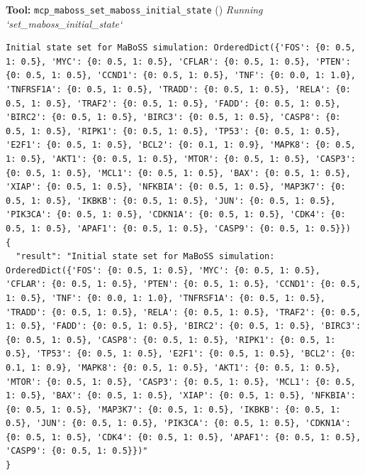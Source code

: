 \documentclass[11pt,a4paper]{article}
\begin{document}
\begin{toolokbox}
\textbf{Tool:} \texttt{mcp\_maboss\_set\_maboss\_initial\_state} (\checkmark)
\textit{Running `set\_maboss\_initial\_state`}
\begin{lstlisting}
Initial state set for MaBoSS simulation: OrderedDict({'FOS': {0: 0.5, 1: 0.5}, 'MYC': {0: 0.5, 1: 0.5}, 'CFLAR': {0: 0.5, 1: 0.5}, 'PTEN': {0: 0.5, 1: 0.5}, 'CCND1': {0: 0.5, 1: 0.5}, 'TNF': {0: 0.0, 1: 1.0}, 'TNFRSF1A': {0: 0.5, 1: 0.5}, 'TRADD': {0: 0.5, 1: 0.5}, 'RELA': {0: 0.5, 1: 0.5}, 'TRAF2': {0: 0.5, 1: 0.5}, 'FADD': {0: 0.5, 1: 0.5}, 'BIRC2': {0: 0.5, 1: 0.5}, 'BIRC3': {0: 0.5, 1: 0.5}, 'CASP8': {0: 0.5, 1: 0.5}, 'RIPK1': {0: 0.5, 1: 0.5}, 'TP53': {0: 0.5, 1: 0.5}, 'E2F1': {0: 0.5, 1: 0.5}, 'BCL2': {0: 0.1, 1: 0.9}, 'MAPK8': {0: 0.5, 1: 0.5}, 'AKT1': {0: 0.5, 1: 0.5}, 'MTOR': {0: 0.5, 1: 0.5}, 'CASP3': {0: 0.5, 1: 0.5}, 'MCL1': {0: 0.5, 1: 0.5}, 'BAX': {0: 0.5, 1: 0.5}, 'XIAP': {0: 0.5, 1: 0.5}, 'NFKBIA': {0: 0.5, 1: 0.5}, 'MAP3K7': {0: 0.5, 1: 0.5}, 'IKBKB': {0: 0.5, 1: 0.5}, 'JUN': {0: 0.5, 1: 0.5}, 'PIK3CA': {0: 0.5, 1: 0.5}, 'CDKN1A': {0: 0.5, 1: 0.5}, 'CDK4': {0: 0.5, 1: 0.5}, 'APAF1': {0: 0.5, 1: 0.5}, 'CASP9': {0: 0.5, 1: 0.5}})
{
  "result": "Initial state set for MaBoSS simulation: OrderedDict({'FOS': {0: 0.5, 1: 0.5}, 'MYC': {0: 0.5, 1: 0.5}, 'CFLAR': {0: 0.5, 1: 0.5}, 'PTEN': {0: 0.5, 1: 0.5}, 'CCND1': {0: 0.5, 1: 0.5}, 'TNF': {0: 0.0, 1: 1.0}, 'TNFRSF1A': {0: 0.5, 1: 0.5}, 'TRADD': {0: 0.5, 1: 0.5}, 'RELA': {0: 0.5, 1: 0.5}, 'TRAF2': {0: 0.5, 1: 0.5}, 'FADD': {0: 0.5, 1: 0.5}, 'BIRC2': {0: 0.5, 1: 0.5}, 'BIRC3': {0: 0.5, 1: 0.5}, 'CASP8': {0: 0.5, 1: 0.5}, 'RIPK1': {0: 0.5, 1: 0.5}, 'TP53': {0: 0.5, 1: 0.5}, 'E2F1': {0: 0.5, 1: 0.5}, 'BCL2': {0: 0.1, 1: 0.9}, 'MAPK8': {0: 0.5, 1: 0.5}, 'AKT1': {0: 0.5, 1: 0.5}, 'MTOR': {0: 0.5, 1: 0.5}, 'CASP3': {0: 0.5, 1: 0.5}, 'MCL1': {0: 0.5, 1: 0.5}, 'BAX': {0: 0.5, 1: 0.5}, 'XIAP': {0: 0.5, 1: 0.5}, 'NFKBIA': {0: 0.5, 1: 0.5}, 'MAP3K7': {0: 0.5, 1: 0.5}, 'IKBKB': {0: 0.5, 1: 0.5}, 'JUN': {0: 0.5, 1: 0.5}, 'PIK3CA': {0: 0.5, 1: 0.5}, 'CDKN1A': {0: 0.5, 1: 0.5}, 'CDK4': {0: 0.5, 1: 0.5}, 'APAF1': {0: 0.5, 1: 0.5}, 'CASP9': {0: 0.5, 1: 0.5}})"
}
\end{lstlisting}
\end{toolokbox}
\end{document}
